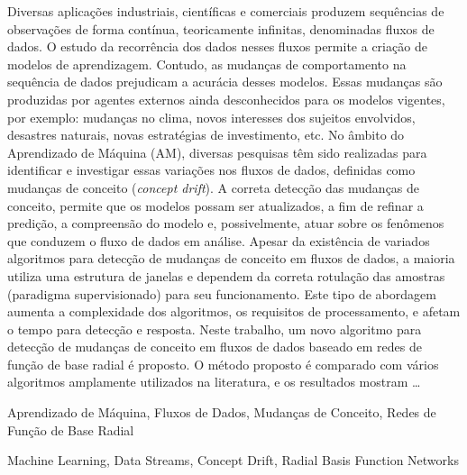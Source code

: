 \documentclass[qual, classic, a4paper]{ufbathesis}
\begin{document}
Diversas aplicações industriais, científicas e comerciais produzem sequências de observações de forma contínua, teoricamente infinitas, denominadas fluxos de dados. 
O estudo da recorrência dos dados nesses fluxos permite a criação de modelos de aprendizagem. Contudo, as mudanças de comportamento na sequência de dados prejudicam a acurácia desses modelos.
Essas mudanças são produzidas por agentes externos ainda desconhecidos para os modelos vigentes, por exemplo: mudanças no clima, novos interesses dos sujeitos envolvidos, desastres naturais, novas estratégias de investimento, etc.
No âmbito do Aprendizado de Máquina (AM), diversas pesquisas têm sido realizadas para identificar e investigar essas variações nos fluxos de dados, definidas como mudanças de conceito (\textit{concept drift}).
A correta detecção das mudanças de conceito, permite que os modelos possam ser atualizados, a fim de refinar a predição, a compreensão do modelo e, possivelmente, atuar sobre os fenômenos que conduzem o fluxo de dados em análise.
Apesar da existência de variados algoritmos para detecção de mudanças de conceito em fluxos de dados, a maioria utiliza uma estrutura de janelas e dependem da correta rotulação das amostras (paradigma supervisionado) para seu funcionamento. Este tipo de abordagem aumenta a complexidade dos algoritmos, os requisitos de processamento, e afetam o tempo para detecção e resposta. 
Neste trabalho, um novo algoritmo para detecção de mudanças de conceito em fluxos de dados baseado em redes de função de base radial é proposto. O método proposto é comparado com vários algoritmos amplamente utilizados na literatura, e os resultados mostram \ldots {}

\begin{keywords}
    Aprendizado de Máquina, Fluxos de Dados, Mudanças de Conceito, Redes de Função de Base Radial
\end{keywords}

\abstract


\begin{keywords}
    Machine Learning, Data Streams, Concept Drift, Radial Basis Function Networks
\end{keywords}

\end{document}
